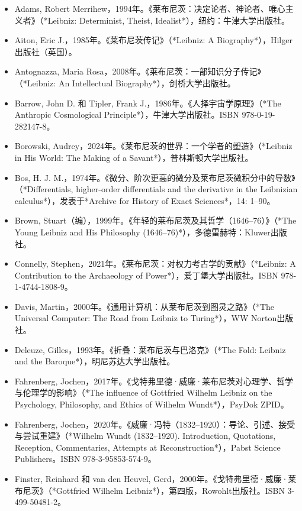 \begin{itemize}
\item Adams, Robert Merrihew，1994年。《莱布尼茨：决定论者、神论者、唯心主义者》（*Leibniz: Determinist, Theist, Idealist*），纽约：牛津大学出版社。  
\item Aiton, Eric J.，1985年。《莱布尼茨传记》（*Leibniz: A Biography*），Hilger出版社（英国）。  
\item Antognazza, Maria Rosa，2008年。《莱布尼茨：一部知识分子传记》（*Leibniz: An Intellectual Biography*），剑桥大学出版社。  
\item Barrow, John D. 和 Tipler, Frank J.，1986年。《人择宇宙学原理》（*The Anthropic Cosmological Principle*），牛津大学出版社。ISBN 978-0-19-282147-8。  
\item Borowski, Audrey，2024年。《莱布尼茨的世界：一个学者的塑造》（*Leibniz in His World: The Making of a Savant*），普林斯顿大学出版社。  
\item Bos, H. J. M.，1974年。《微分、阶次更高的微分及莱布尼茨微积分中的导数》（*Differentials, higher-order differentials and the derivative in the Leibnizian calculus*），发表于*Archive for History of Exact Sciences*，14: 1–90。  
\item Brown, Stuart（编），1999年。《年轻的莱布尼茨及其哲学（1646–76）》（*The Young Leibniz and His Philosophy (1646–76)*），多德雷赫特：Kluwer出版社。  
\item Connelly, Stephen，2021年。《莱布尼茨：对权力考古学的贡献》（*Leibniz: A Contribution to the Archaeology of Power*），爱丁堡大学出版社。ISBN 978-1-4744-1808-9。  
\item Davis, Martin，2000年。《通用计算机：从莱布尼茨到图灵之路》（*The Universal Computer: The Road from Leibniz to Turing*），WW Norton出版社。  
\item Deleuze, Gilles，1993年。《折叠：莱布尼茨与巴洛克》（*The Fold: Leibniz and the Baroque*），明尼苏达大学出版社。  
\item Fahrenberg, Jochen，2017年。《戈特弗里德·威廉·莱布尼茨对心理学、哲学与伦理学的影响》（*The influence of Gottfried Wilhelm Leibniz on the Psychology, Philosophy, and Ethics of Wilhelm Wundt*），PsyDok ZPID。  
\item Fahrenberg, Jochen，2020年。《威廉·冯特（1832–1920）：导论、引述、接受与尝试重建》（*Wilhelm Wundt (1832–1920). Introduction, Quotations, Reception, Commentaries, Attempts at Reconstruction*），Pabst Science Publishers。ISBN 978-3-95853-574-9。  
\item Finster, Reinhard 和 van den Heuvel, Gerd，2000年。《戈特弗里德·威廉·莱布尼茨》（*Gottfried Wilhelm Leibniz*），第四版，Rowohlt出版社。ISBN 3-499-50481-2。  

\end{itemize}

